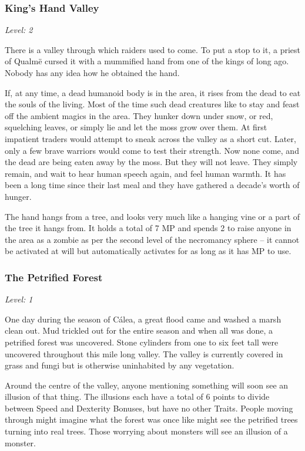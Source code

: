 \subsubsection{King's Hand Valley}

\textit{Level: 2}

There is a valley through which raiders used to come.  To put a stop to it, a priest of Qualm\"{e} cursed it with a mummified hand from one of the kings of long ago.  Nobody has any idea how he obtained the hand.

If, at any time, a dead humanoid body is in the area, it rises from the dead to eat the souls of the living.  Most of the time such dead creatures like to stay and feast off the ambient magics in the area.  They hunker down under snow, or red, squelching leaves, or simply lie and let the moss grow over them.   At first impatient traders would attempt to sneak across the valley as a short cut.  Later, only a few brave warriors would come to test their strength.  Now none come, and the dead are being eaten away by the moss.  But they will not leave.  They simply remain, and wait to hear human speech again, and feel human warmth.  It has been a long time since their last meal and they have gathered a decade's worth of hunger.

The hand hangs from a tree, and looks very much like a hanging vine or a part of the tree it hangs from.  It holds a total of 7 MP and spends 2 to raise anyone in the area as a zombie as per the second level of the necromancy sphere -- it cannot be activated at will but automatically activates for as long as it has MP to use.

\subsubsection{The Petrified Forest}

\textit{Level: 1}

One day during the season of C\'{a}lea, a great flood came and washed a marsh clean out.  Mud trickled out for the entire season and when all was done, a petrified forest was uncovered.  Stone cylinders from one to six feet tall were uncovered throughout this mile long valley.  The valley is currently covered in grass and fungi but is otherwise uninhabited by any vegetation.

Around the centre of the valley, anyone mentioning something will soon see an illusion of that thing.  The illusions each have a total of 6 points to divide between Speed and Dexterity Bonuses, but have no other Traits.  People moving through might imagine what the forest was once like might see the petrified trees turning into real trees.  Those worrying about monsters will see an illusion of a monster.

